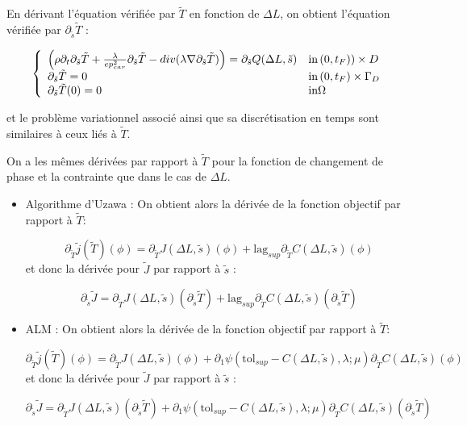 \documentclass[11pt,a4paper]{article}
\begin{document}
En dérivant l'équation vérifiée par $\tilde{T}$ en fonction de $\Delta L$, on obtient l'équation vérifiée par $\partial_{\tilde{s}}\tilde{T}$ :

\begin{equation}
\label{eq:ChaleurDerTildes}
\left\{\begin{array}{ll}
	\Big(\rho\partial_t \partial_{\tilde{s}}\tilde{T}+\frac{\lambda}{ep_{car}^2} \partial_{\tilde{s}}\tilde{T}-div(\lambda\nabla \partial_{\tilde{s}}\tilde{T})\Big)=\partial_{\tilde{s}}Q(\Delta L,\tilde{s})& \textrm{in\,}(0,t_F))\times D \\
	\partial_{\tilde{s}}\tilde{T}=0 & \textrm{in\,}(0,t_F)\times \Gamma_D \\
	\partial_{\tilde{s}}\tilde{T}(0)=0 & \textrm{in} \Omega
\end{array}\right.
\end{equation}

et le problème variationnel associé ainsi que sa discrétisation en temps sont similaires à ceux liés à $\tilde{T}$.

On a les mêmes dérivées par rapport à $\tilde{T}$ pour la fonction de changement de phase et la contrainte que dans le cas de $\Delta L$. 

\begin{itemize}
	\item Algorithme d'Uzawa : On obtient alors la dérivée de la fonction objectif par rapport à $\tilde{T}$:
	
	\begin{equation}
	\partial_{\tilde{T}}\tilde{j}(\tilde{T})(\phi)= \partial_{\tilde{T}}J(\Delta L,\tilde{s})(\phi)+ \textrm{lag}_{sup} \partial_{\tilde{T}}C(\Delta L,\tilde{s})(\phi)
	\end{equation}
	et donc la dérivée pour $\tilde{J}$ par rapport à $\tilde{s}$ :
	
	\begin{equation}
	\partial_{\tilde{s}}\tilde{J}= \partial_{\tilde{T}}J(\Delta L,\tilde{s})(\partial_{\tilde{s}}\tilde{T})+ \textrm{lag}_{sup} \partial_{\tilde{T}}C(\Delta L,\tilde{s})(\partial_{\tilde{s}}\tilde{T})
	\end{equation}
	
	\item ALM : On obtient alors la dérivée de la fonction objectif par rapport à $\tilde{T}$:
	
	\begin{equation}
	\partial_{\tilde{T}}\tilde{j}(\tilde{T})(\phi)= \partial_{\tilde{T}}J(\Delta L,\tilde{s})(\phi)+\partial_1\psi\left(\textrm{tol}_{sup}-C(\Delta L,\tilde{s}),\lambda;\mu\right) \partial_{\tilde{T}}C(\Delta L,\tilde{s})(\phi)
	\end{equation}
	et donc la dérivée pour $\tilde{J}$ par rapport à $\tilde{s}$ :
	
	\begin{equation}
	\partial_{\tilde{s}}\tilde{J}= \partial_{\tilde{T}}J(\Delta L,\tilde{s})(\partial_{\tilde{s}}\tilde{T})+ \partial_1\psi\left(\textrm{tol}_{sup}-C(\Delta L,\tilde{s}),\lambda;\mu\right) \partial_{\tilde{T}}C(\Delta L,\tilde{s})(\partial_{\tilde{s}}\tilde{T})
	\end{equation}
\end{itemize}
\end{document}

